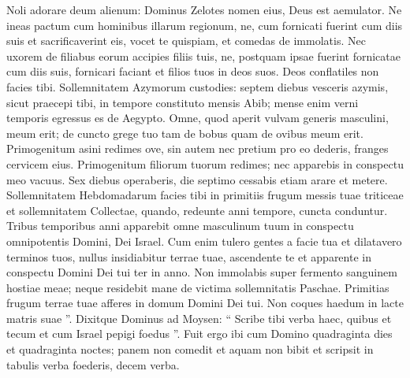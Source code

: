 \begin{biblechapter}
\begin{biblechapter}
\begin{biblechapter}
\begin{biblechapter}
\begin{biblechapter}
\begin{biblechapter}
\begin{biblechapter}
\begin{biblechapter}
\begin{biblechapter}
\begin{biblechapter}
\begin{biblechapter}
\begin{biblechapter}
\begin{biblechapter}
\begin{biblechapter}
\begin{biblechapter}
\begin{biblechapter}
\begin{biblechapter}
\begin{biblechapter}
\begin{biblechapter}
\begin{biblechapter}
\begin{biblechapter}
\begin{biblechapter}
\begin{biblechapter}
\begin{biblechapter}
\begin{biblechapter}
\begin{biblechapter}
\begin{biblechapter}
\begin{biblechapter}
\begin{biblechapter}
\begin{biblechapter}
\begin{biblechapter}
\begin{biblechapter}
\begin{biblechapter}
\begin{biblechapter}
 \verse Noli adorare deum alienum: Dominus Zelotes nomen eius, Deus est aemulator. 
 \verse Ne ineas pactum cum hominibus illarum regionum, ne, cum fornicati fuerint cum diis suis et sacrificaverint eis, vocet te quispiam, et comedas de immolatis. 
 \verse Nec uxorem de filiabus eorum accipies filiis tuis, ne, postquam ipsae fuerint fornicatae cum diis suis, fornicari faciant et filios tuos in deos suos.
 \verse Deos conflatiles non facies tibi.
 \verse Sollemnitatem Azymorum custodies: septem diebus vesceris azymis, sicut praecepi tibi, in tempore constituto mensis Abib; mense enim verni temporis egressus es de Aegypto.
 \verse Omne, quod aperit vulvam generis masculini, meum erit; de cuncto grege tuo tam de bobus quam de ovibus meum erit. 
\verse Primogenitum asini redimes ove, sin autem nec pretium pro eo dederis, franges cervicem eius. Primogenitum filiorum tuorum redimes; nec apparebis in conspectu meo vacuus.
 \verse Sex diebus operaberis, die septimo cessabis etiam arare et metere.
 \verse Sollemnitatem Hebdomadarum facies tibi in primitiis frugum messis tuae triticeae et sollemnitatem Collectae, quando, redeunte anni tempore, cuncta conduntur.
 \verse Tribus temporibus anni apparebit omne masculinum tuum in conspectu omnipotentis Domini, Dei Israel. 
\verse Cum enim tulero gentes a facie tua et dilatavero terminos tuos, nullus insidiabitur terrae tuae, ascendente te et apparente in conspectu Domini Dei tui ter in anno.
 \verse Non immolabis super fermento sanguinem hostiae meae; neque residebit mane de victima sollemnitatis Paschae.
 \verse Primitias frugum terrae tuae afferes in domum Domini Dei tui.
 Non coques haedum in lacte matris suae ”.
 \verse Dixitque Dominus ad Moysen: “ Scribe tibi verba haec, quibus et tecum et cum Israel pepigi foedus ”.
 \verse Fuit ergo ibi cum Domino quadraginta dies et quadraginta noctes; panem non comedit et aquam non bibit et scripsit in tabulis verba foederis, decem verba.

\end{biblechapter}
\end{biblechapter}
\end{biblechapter}
\end{biblechapter}
\end{biblechapter}
\end{biblechapter}
\end{biblechapter}
\end{biblechapter}
\end{biblechapter}
\end{biblechapter}
\end{biblechapter}
\end{biblechapter}
\end{biblechapter}
\end{biblechapter}
\end{biblechapter}
\end{biblechapter}
\end{biblechapter}
\end{biblechapter}
\end{biblechapter}
\end{biblechapter}
\end{biblechapter}
\end{biblechapter}
\end{biblechapter}
\end{biblechapter}
\end{biblechapter}
\end{biblechapter}
\end{biblechapter}
\end{biblechapter}
\end{biblechapter}
\end{biblechapter}
\end{biblechapter}
\end{biblechapter}
\end{biblechapter}
\end{biblechapter}
